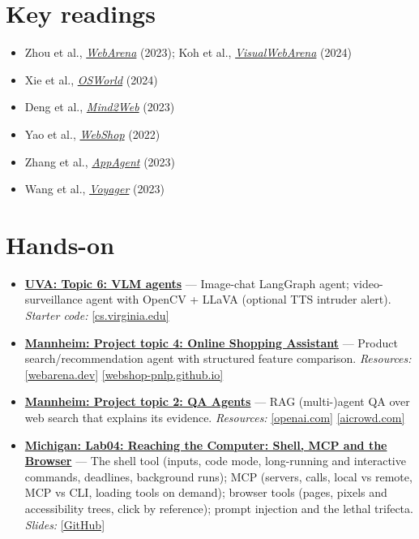 \documentclass[10pt,oneside]{report}
\begin{document}
\section{Key readings}
\begin{itemize}
\item Zhou et al., \href{https://arxiv.org/abs/2307.13854}{\emph{WebArena}} (2023); Koh et al., \href{https://arxiv.org/abs/2401.13649}{\emph{VisualWebArena}} (2024)
\item Xie et al., \href{https://arxiv.org/abs/2404.07972}{\emph{OSWorld}} (2024)
\item Deng et al., \href{https://arxiv.org/abs/2306.06070}{\emph{Mind2Web}} (2023)
\item Yao et al., \href{https://arxiv.org/abs/2207.01206}{\emph{WebShop}} (2022)
\item Zhang et al., \href{https://arxiv.org/abs/2312.13771}{\emph{AppAgent}} (2023)
\item Wang et al., \href{https://arxiv.org/abs/2305.16291}{\emph{Voyager}} (2023)
\end{itemize}
\section{Hands-on}
\begin{itemize}
\item \hyperlink{asg-UVA-6}{\textbf{UVA: Topic 6: VLM agents}} --- Image-chat LangGraph agent; video-surveillance agent with OpenCV + LLaVA (optional TTS intruder alert). \textit{Starter code:} \href{https://www.cs.virginia.edu/\%7Ermw7my/Courses/AgenticAISpring2026/Topic6VLM/vlm.html}{[cs.virginia.edu]}
\item \hyperlink{asg-MANN-9}{\textbf{Mannheim: Project topic 4: Online Shopping Assistant}} --- Product search/recommendation agent with structured feature comparison. \textit{Resources:} \href{https://webarena.dev/}{[webarena.dev]} \href{https://webshop-pnlp.github.io/}{[webshop-pnlp.github.io]}
\item \hyperlink{asg-MANN-7}{\textbf{Mannheim: Project topic 2: QA Agents}} --- RAG (multi-)agent QA over web search that explains its evidence. \textit{Resources:} \href{https://openai.com/index/browsecomp/}{[openai.com]} \href{https://www.aicrowd.com/challenges/meta-comprehensive-rag-benchmark-kdd-cup-2024}{[aicrowd.com]}
\item \hyperlink{asg-UMICH-11}{\textbf{Michigan: Lab04: Reaching the Computer: Shell, MCP and the Browser}} --- The shell tool (inputs, code mode, long-running and interactive commands, deadlines, background runs); MCP (servers, calls, local vs remote, MCP vs CLI, loading tools on demand); browser tools (pages, pixels and accessibility trees, click by reference); prompt injection and the lethal trifecta. \textit{Slides:} \href{https://github.com/eecs498-aase/materials/blob/main/labs/Lab04/slides.pdf}{[GitHub]}
\end{itemize}
\end{document}
